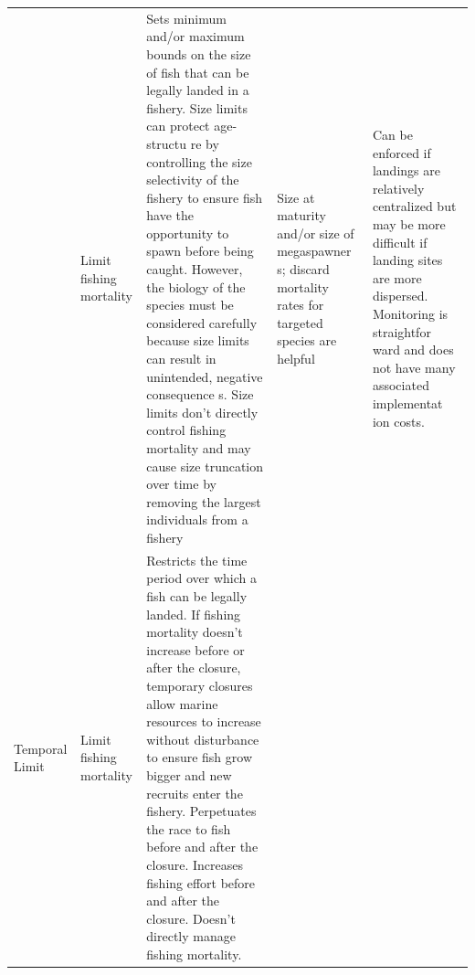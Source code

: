\documentclass[]{book}
\begin{document}
\begin{longtable}[]{@{}lllll@{}}
\begin{minipage}[t]{0.17\columnwidth}
\end{minipage} & \begin{minipage}[t]{0.17\columnwidth}\raggedright\strut
Limit fishing mortality\strut
\end{minipage} & \begin{minipage}[t]{0.17\columnwidth}\raggedright\strut
Sets minimum and/or maximum bounds on the size of fish that can be
legally landed in a fishery. Size limits can protect age-structu re by
controlling the size selectivity of the fishery to ensure fish have the
opportunity to spawn before being caught. However, the biology of the
species must be considered carefully because size limits can result in
unintended, negative consequence s. Size limits don't directly control
fishing mortality and may cause size truncation over time by removing
the largest individuals from a fishery\strut
\end{minipage} & \begin{minipage}[t]{0.17\columnwidth}\raggedright\strut
Size at maturity and/or size of megaspawner s; discard mortality rates
for targeted species are helpful\strut
\end{minipage} & \begin{minipage}[t]{0.17\columnwidth}\raggedright\strut
Can be enforced if landings are relatively centralized but may be more
difficult if landing sites are more dispersed. Monitoring is straightfor
ward and does not have many associated implementat ion costs.\strut
\end{minipage}\tabularnewline
\begin{minipage}[t]{0.17\columnwidth}\raggedright\strut
Temporal Limit\strut
\end{minipage} & \begin{minipage}[t]{0.17\columnwidth}\raggedright\strut
Limit fishing mortality\strut
\end{minipage} & \begin{minipage}[t]{0.17\columnwidth}\raggedright\strut
Restricts the time period over which a fish can be legally landed. If
fishing mortality doesn't increase before or after the closure,
temporary closures allow marine resources to increase without
disturbance to ensure fish grow bigger and new recruits enter the
fishery. Perpetuates the race to fish before and after the closure.
Increases fishing effort before and after the closure. Doesn't directly
manage fishing mortality.\strut
\end{minipage} & \begin{minipage}[t]{0.17\columnwidth}\raggedright\strut

\end{minipage}
\end{longtable}
\end{document}
